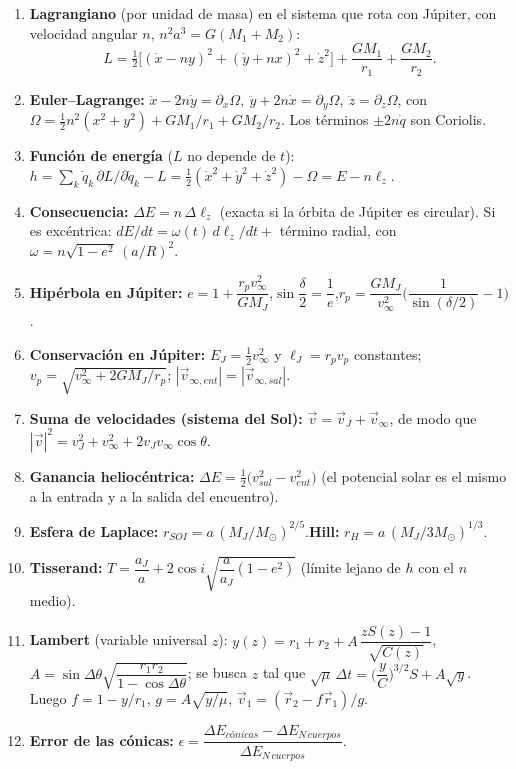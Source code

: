 \documentclass[11pt,letterpaper]{article}
\newcommand{\vinf}{v_\infty}\newcommand{\RJ}{R_J}
\begin{document}
\begin{enumerate}[label=\textbf{F\arabic*.}]
\item \textbf{Lagrangiano} (por unidad de masa) en el sistema que rota con Júpiter, con velocidad angular $n$, $n^2a^3=G(M_1+M_2)$:
\[L=\tfrac12\big[(\dot x-ny)^2+(\dot y+nx)^2+\dot z^2\big]+\frac{GM_1}{r_1}+\frac{GM_2}{r_2}.\]
\item \textbf{Euler–Lagrange:} $\ddot x-2n\dot y=\partial_x\Omega,\ \ddot y+2n\dot x=\partial_y\Omega,\ \ddot z=\partial_z\Omega$, con $\Omega=\tfrac12n^2(x^2+y^2)+GM_1/r_1+GM_2/r_2$. Los términos $\pm2n\dot q$ son Coriolis.
\item \textbf{Función de energía} ($L$ no depende de $t$): $h=\sum_k\dot q_k\,\partial L/\partial\dot q_k-L=\tfrac12(\dot x^2+\dot y^2+\dot z^2)-\Omega=E-n\ell_z$.
\item \textbf{Consecuencia:} $\Delta E=n\,\Delta\ell_z$ (exacta si la órbita de Júpiter es circular). Si es excéntrica: $dE/dt=\omega(t)\,d\ell_z/dt+$ término radial, con $\omega=n\sqrt{1-e^2}\,(a/R)^2$.
\item \textbf{Hipérbola en Júpiter:} $e=1+\dfrac{r_p\vinf^2}{GM_J}$,\qquad $\sin\dfrac\delta2=\dfrac1e$,\qquad $r_p=\dfrac{GM_J}{\vinf^2}\Big(\dfrac1{\sin(\delta/2)}-1\Big)$.
\item \textbf{Conservación en Júpiter:} $E_J=\tfrac12\vinf^2$ y $\ell_J=r_pv_p$ constantes; $v_p=\sqrt{\vinf^2+2GM_J/r_p}$; $|\vec v_{\infty,ent}|=|\vec v_{\infty,sal}|$.
\item \textbf{Suma de velocidades (sistema del Sol):} $\vec v=\vec v_J+\vec v_\infty$, de modo que $|\vec v|^2=v_J^2+\vinf^2+2v_J\vinf\cos\theta$.
\item \textbf{Ganancia heliocéntrica:} $\Delta E=\tfrac12\big(v_{sal}^2-v_{ent}^2\big)$ (el potencial solar es el mismo a la entrada y a la salida del encuentro).
\item \textbf{Esfera de Laplace:} $r_{SOI}=a\,(M_J/M_\odot)^{2/5}$.\quad \textbf{Hill:} $r_H=a\,(M_J/3M_\odot)^{1/3}$.
\item \textbf{Tisserand:} $T=\dfrac{a_J}{a}+2\cos i\sqrt{\dfrac{a}{a_J}(1-e^2)}$ (límite lejano de $h$ con el $n$ medio).
\item \textbf{Lambert} (variable universal $z$): $y(z)=r_1+r_2+A\,\dfrac{zS(z)-1}{\sqrt{C(z)}}$,\ $A=\sin\Delta\theta\sqrt{\dfrac{r_1r_2}{1-\cos\Delta\theta}}$; se busca $z$ tal que $\sqrt\mu\,\Delta t=\Big(\dfrac{y}{C}\Big)^{3/2}S+A\sqrt y$. Luego $f=1-y/r_1$, $g=A\sqrt{y/\mu}$, $\vec v_1=(\vec r_2-f\vec r_1)/g$.
\item \textbf{Error de las cónicas:} $\epsilon=\dfrac{\Delta E_{cónicas}-\Delta E_{N\,cuerpos}}{\Delta E_{N\,cuerpos}}$.
\end{enumerate}
\end{document}
